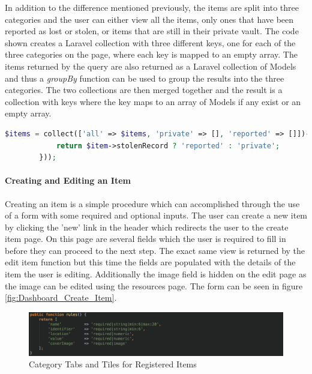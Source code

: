 In addition to the difference mentioned previously, the items are split into three categories and the user can either view all the items, only ones that have been reported as lost or stolen, or items that are still in their private vault. The code shown creates a Laravel collection with three different keys, one for each of the three categories on the page, where each key is mapped to an empty array. The items returned by the query are also returned as a Laravel collection of Models and thus a \emph{groupBy} function can be used to group the results into the three categories. The two collections are then merged together and the result is a collection with keys where the key maps to an array of Models if any exist or an empty array.

\begin{lstlisting}[language=php]
	$items = collect(['all' => $items, 'private' => [], 'reported' => []])->merge($items->groupBy(function($item) {
            return $item->stolenRecord ? 'reported' : 'private';
        }));
\end{lstlisting}

\paragraph{Creating and Editing an Item}

Creating an item is a simple procedure which can accomplished through the use of a form with some required and optional inputs. The user can create a new item by clicking the 'new' link in the header which redirects the user to the create item page. On this page are several fields which the user is required to fill in before they can proceed to the next step. The exact same view is returned by the edit item function but this time the fields are populated with the details of the item the user is editing. Additionally the image field is hidden on the edit page as the image can be edited using the resources page. The form can be seen in figure \ref{fig:Dashboard_Create_Item}.

\begin{figure}[H]
	\centering
	\includegraphics[width=1.0\textwidth]{images/Code/Validation_Rules}
	\caption{Category Tabs and Tiles for Registered Items} \label{fig:Validation_Rules}
\end{figure}

